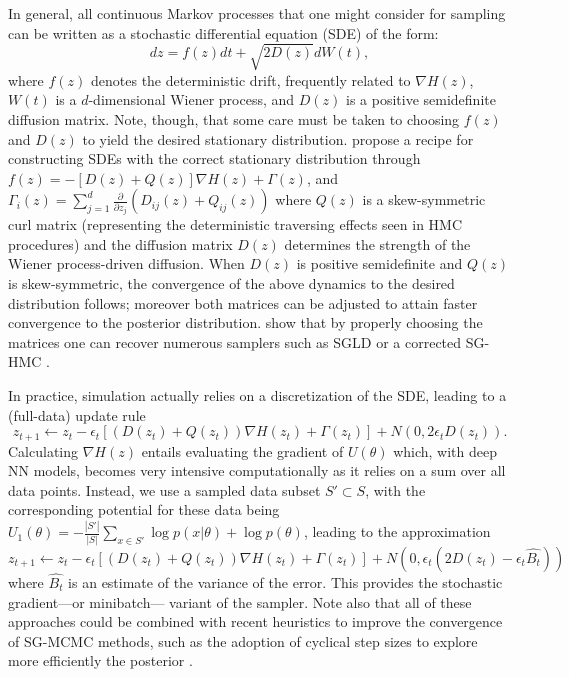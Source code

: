 In general, all continuous Markov processes that one might consider for sampling can be written
as a stochastic differential equation (SDE) of the form:
\begin{equation}
dz = f(z)dt +
\sqrt{ 2D(z)}dW(t),
\end{equation}
where $f(z)$ denotes the deterministic drift, frequently
related to $\nabla H(z)$,
$W(t)$  is a $d$-dimensional Wiener process, and 
$D(z)$ is a positive semidefinite diffusion matrix. Note, though,
that some care must be taken to choosing $f(z)$ and $D(z)$ 
to yield the desired stationary distribution.
\parencite{ma2015complete} propose a recipe for constructing SDEs with the correct stationary distribution through 
$f(z) = - [D(z) + Q(z)] \nabla H(z) + \Gamma (z)$, 
and $\Gamma _i (z) = \sum _{j=1}^d 
\frac{\partial  }{\partial z_j}(D_{ij} (z) + Q_{ij} (z) )
$
where $ Q(z)$ is a skew-symmetric curl matrix (representing the deterministic traversing effects seen
in HMC procedures) and the diffusion matrix $D(z)$
determines the strength of the Wiener process-driven diffusion.
When 
$D(z)$ is positive semidefinite and $Q(z)$ is skew-symmetric, 
 the convergence of the above dynamics to the desired 
distribution follows; moreover both matrices can be adjusted to attain faster convergence to
the posterior distribution. \parencite{ma2015complete} show that by properly choosing the matrices  one can recover numerous samplers such
as SGLD \parencite{welling2011bayesian} or a corrected SG-HMC \parencite{chen2014stochastic}.

In practice, simulation actually relies on a discretization of the SDE, leading to a (full-data) update rule
\begin{equation}
z_{t+1} \leftarrow z_t - \epsilon_t \left[ ( D(z_t) + Q(z_t) )
\nabla H(z_t) + \Gamma (z_t)\right]
+ N (0, 2\epsilon _t D(z_t)).
\end{equation} 
Calculating $\nabla H(z)$ entails evaluating the gradient of $U(\theta )$
which, with deep NN models, 
 becomes very intensive computationally as it relies on a sum
over all data points. Instead, 
we use a sampled data subset $S' \subset S$, with the corresponding potential for these data being 
$U_1 (\theta ) = -\frac{|S'|}{|S|} \sum _{x \in S'}
\log p(x|\theta ) + \log p(\theta )$, leading 
to the approximation 
\begin{equation}
z_{t+1} \leftarrow z_t - \epsilon_t \left[ ( D(z_t) + Q(z_t) )
\nabla H (z_t) + \Gamma (z_t) \right]
+ N (0, \epsilon _t (2 D(z_t)- \epsilon_t \hat {B_t}))
\end{equation} 
where $\hat {B_t}$ is an estimate of the variance of the error.
This provides the  stochastic gradient—or minibatch— variant of the sampler. Note also that all of these approaches could be combined with recent heuristics to improve the convergence of SG-MCMC methods, such as the adoption of cyclical step sizes to explore more efficiently the posterior  \parencite{7926641}.


